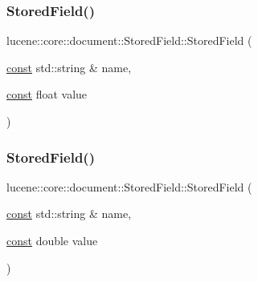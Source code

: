 \mbox{\label{classlucene_1_1core_1_1document_1_1StoredField_ac021b20892199399680b9d616f3a1889}} 
\subsubsection{\texorpdfstring{Stored\+Field()}{StoredField()}\hspace{0.1cm}{\footnotesize\ttfamily [14/15]}}
{\footnotesize\ttfamily lucene\+::core\+::document\+::\+Stored\+Field\+::\+Stored\+Field (\begin{DoxyParamCaption}\item[{\mbox{\hyperlink{ZlibCrc32_8h_a2c212835823e3c54a8ab6d95c652660e}{const}} std\+::string \&}]{name,  }\item[{\mbox{\hyperlink{ZlibCrc32_8h_a2c212835823e3c54a8ab6d95c652660e}{const}} float}]{value }\end{DoxyParamCaption})\hspace{0.3cm}{\ttfamily [inline]}}

\mbox{\label{classlucene_1_1core_1_1document_1_1StoredField_a072f406b9425f12e85b2a784438961e9}} 
\subsubsection{\texorpdfstring{Stored\+Field()}{StoredField()}\hspace{0.1cm}{\footnotesize\ttfamily [15/15]}}
{\footnotesize\ttfamily lucene\+::core\+::document\+::\+Stored\+Field\+::\+Stored\+Field (\begin{DoxyParamCaption}\item[{\mbox{\hyperlink{ZlibCrc32_8h_a2c212835823e3c54a8ab6d95c652660e}{const}} std\+::string \&}]{name,  }\item[{\mbox{\hyperlink{ZlibCrc32_8h_a2c212835823e3c54a8ab6d95c652660e}{const}} double}]{value }\end{DoxyParamCaption})\hspace{0.3cm}{\ttfamily [inline]}}

